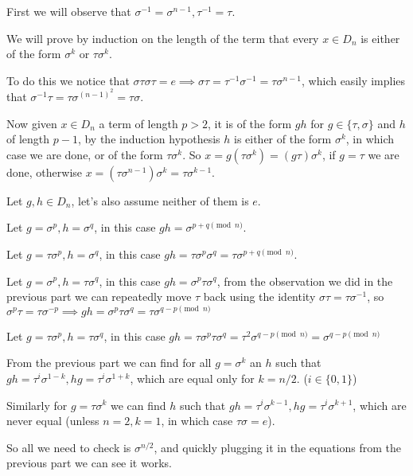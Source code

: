 \begin{cExercise}
	\begin{cPart}
			First we will observe that $\sigma^{-1}=\sigma^{n-1},\tau^{-1}=\tau$.
		
		We will prove by induction on the length of the term that every $x\in D_n$ is either of the form $\sigma^k$ or $\tau\sigma^k$.
		
		To do this we notice that $\sigma\tau\sigma\tau=e\implies\sigma\tau=\tau^{-1}\sigma^{-1}=\tau\sigma^{n-1}$, which easily implies that $\sigma^{-1}\tau=\tau\sigma^{(n-1)^2}=\tau\sigma$.
		
		Now given $x\in D_n$ a term of length $p>2$, it is of the form $gh$ for $g\in\{\tau,\sigma\}$ and $h$ of length $p-1$, by the induction hypothesis $h$ is either of the form $\sigma^k$, in which case we are done, or of the form $\tau\sigma^k$. So $x=g(\tau\sigma^{k})=(g\tau)\sigma^k$, if $g=\tau$ we are done, otherwise $x=(\tau\sigma^{n-1})\sigma^k=\tau\sigma^{k-1}$.
	\end{cPart}
	\begin{cPart}
		Let $g,h\in D_n$, let's also assume neither of them is $e$.
		
		Let $g=\sigma^p,h=\sigma^q$, in this case $gh=\sigma^{p+q\pmod n}$.
		
		Let $g=\tau \sigma^p,h=\sigma^q$, in this case $gh=\tau\sigma^p\sigma^q=\tau\sigma^{p+q\pmod n}$.
		
		Let $g=\sigma^p,h=\tau\sigma^q$, in this case $gh=\sigma^p\tau\sigma^q$, from the observation we did in the previous part we can repeatedly move $\tau$ back using the identity $\sigma\tau=\tau\sigma^{-1}$, so $\sigma^p\tau=\tau\sigma^{-p}\implies gh=\sigma^p\tau\sigma^q=\tau\sigma^{q-p\pmod n}$
		
		Let $g=\tau \sigma^p,h=\tau\sigma^q$, in this case $gh=\tau\sigma^p\tau\sigma^q=\tau^2\sigma^{q-p\pmod n}=\sigma^{q-p\pmod n}$
	\end{cPart}
	\begin{cPart}
		From the previous part we can find for all $g=\sigma^k$ an $h$ such that $gh=\tau^i\sigma^{1-k},hg=\tau^i\sigma^{1+k}$, which are equal only for $k=n/2$. ($i\in\{0,1\}$)
		
		Similarly for $g=\tau\sigma^k$ we can find $h$ such that $gh=\tau^i\sigma^{k-1},hg=\tau^i\sigma^{k+1}$, which are never equal (unless $n=2,k=1$, in which case $\tau\sigma=e$).
		
		So all we need to check is $\sigma^{n/2}$, and quickly plugging it in the equations from the previous part we can see it works.
	\end{cPart}
\end{cExercise}
